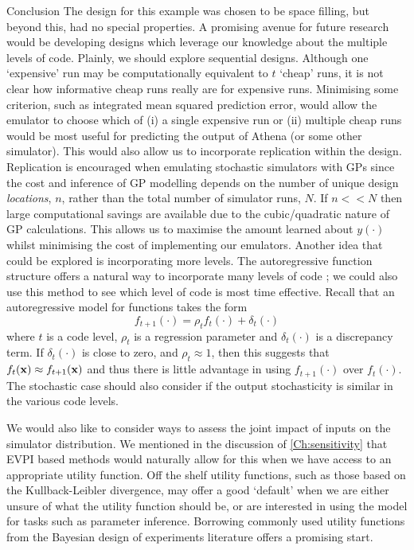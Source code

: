 \begin{chapter}{Conclusion \label{Ch:conclusions}}
The design for this example was chosen to be space filling, but beyond this, had no special properties. A promising avenue for future research would be developing designs which leverage our knowledge about the multiple levels of code.  Plainly, we should explore sequential designs. Although one `expensive' run may be computationally equivalent to $t$ `cheap' runs, it is not clear how informative cheap runs really are for expensive runs. Minimising some criterion, such as integrated mean squared prediction error, would allow the emulator to choose which of (i) a single expensive run or (ii) multiple cheap runs would be most useful for predicting the output of Athena (or some other simulator). This would also allow us to incorporate replication within the design. Replication is encouraged when emulating stochastic simulators with GPs since the cost and inference of GP modelling depends on the number of unique design \textit{locations}, $n$, rather than the total number of simulator runs, $N$. If $n << N$ then large computational savings are available due to the cubic/quadratic nature of GP calculations. This allows us to maximise the amount learned about $y(\cdot)$ whilst minimising the cost of implementing our emulators. Another idea that could be explored is incorporating more levels. The autoregressive function structure offers a natural way to incorporate many levels of code \citep{Kennedy2000}; we could also use this method to see which level of code is most time effective. Recall that an autoregressive model for functions takes the form
\begin{equation}
  f_{t+1}(\cdot) = \rho_{t} f_t(\cdot) + \delta_{t}(\cdot)
\end{equation}
where $t$ is a code level, $\rho_t$ is a regression parameter and $\delta_t(\cdot)$ is a discrepancy term. If $\delta_t(\cdot)$ is close to zero, and $\rho_t \approx 1$, then this suggests that $f_t(\mathbf{x}) \approx f_{t+1}(\mathbf{x})$ and thus there is little advantage in using $f_{t+1}(\cdot)$ over $f_t(\cdot)$. The stochastic case should also consider if the output stochasticity is similar in the various code levels.

We would also like to consider ways to assess the joint impact of inputs on the simulator distribution. We mentioned in the discussion of \cref{Ch:sensitivity} that EVPI based methods would naturally allow for this when we have access to an appropriate utility function. Off the shelf utility functions, such as those based on the Kullback-Leibler divergence, may offer a good `default' when we are either unsure of what the utility function should be, or are interested in using the model for tasks such as parameter inference. Borrowing commonly used utility functions from the Bayesian design of experiments literature offers a promising start.


\end{chapter}
